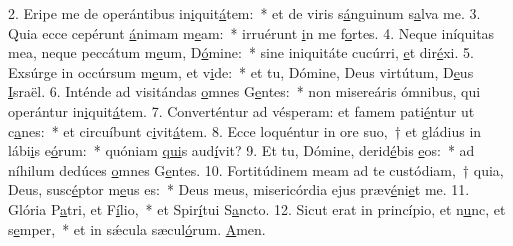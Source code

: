2. Eripe me de operántibus in\uline{i}quit\uline{á}tem:~* et de viris s\uline{á}nguinum s\uline{a}lva me.
3. Quia ecce cepérunt \uline{á}nimam m\uline{e}am:~* irruérunt \uline{i}n me f\uline{o}rtes.
4. Neque iníquitas mea, neque peccátum m\uline{e}um, D\uline{ó}mine:~* sine iniquitáte cucúrri, \uline{e}t dir\uline{é}xi.
5. Exsúrge in occúrsum m\uline{e}um, et v\uline{i}de:~* et tu, Dómine, Deus virtútum, D\uline{e}us \uline{I}sraël.
6. Inténde ad visitándas \uline{o}mnes G\uline{e}ntes:~* non misereáris ómnibus, qui operántur in\uline{i}quit\uline{á}tem.
7. Converténtur ad vésperam: et famem pati\uline{é}ntur ut c\uline{a}nes:~* et circuíbunt c\uline{i}vit\uline{á}tem.
8. Ecce loquéntur in ore suo,~† et gládius in lábi\uline{i}s e\uline{ó}rum:~* quóniam \uline{qui}s aud\uline{í}vit?
9. Et tu, Dómine, derid\uline{é}bis \uline{e}os:~* ad níhilum dedúces \uline{o}mnes G\uline{e}ntes.
10. Fortitúdinem meam ad te custódiam,~† quia, Deus, susc\uline{é}ptor m\uline{e}us es:~* Deus meus, misericórdia ejus præv\uline{é}ni\uline{e}t me.
11. Glória P\uline{a}tri, et F\uline{í}lio,~* et Spir\uline{í}tui S\uline{a}ncto.
12. Sicut erat in princípio, et n\uline{u}nc, et s\uline{e}mper,~* et in sǽcula sæcul\uline{ó}rum. \uline{A}men.
